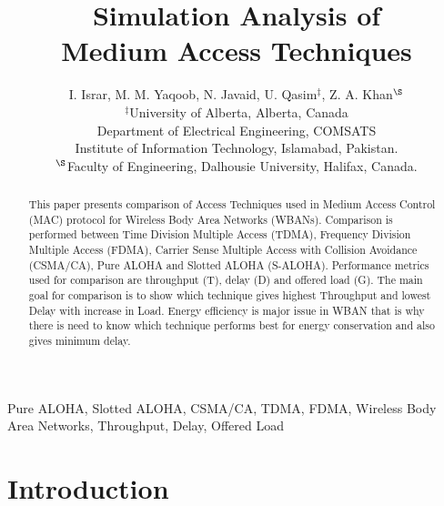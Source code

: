 \documentclass[10pt, conference, compsocconf]{IEEEtran}
\begin{document}
\title{Simulation Analysis of\\ Medium Access Techniques}


\author{I. Israr, M. M. Yaqoob, N. Javaid, U. Qasim$^{\ddag}$, Z. A. Khan$^{\S}$\\

        $^{\ddag}$University of Alberta, Alberta, Canada\\
        Department of Electrical Engineering, COMSATS\\ Institute of
        Information Technology, Islamabad, Pakistan. \\
        $^{\S}$Faculty of Engineering, Dalhousie University, Halifax, Canada.
        }

\maketitle


\begin{abstract}
This paper presents comparison of Access Techniques used in Medium Access Control (MAC) protocol for Wireless Body Area Networks (WBANs). Comparison is performed between Time Division Multiple Access (TDMA), Frequency Division Multiple Access (FDMA), Carrier Sense Multiple Access with Collision Avoidance (CSMA/CA), Pure ALOHA and Slotted ALOHA (S-ALOHA). Performance metrics used for comparison are throughput (T), delay (D) and offered load (G). The main goal for comparison is to show which technique gives highest Throughput and lowest Delay with increase in Load. Energy efficiency is major issue in WBAN that is why there is need to know which technique performs best for energy conservation and also gives minimum delay.
\end{abstract}


\begin{IEEEkeywords}
Pure ALOHA, Slotted ALOHA, CSMA/CA, TDMA, FDMA, Wireless Body Area Networks, Throughput, Delay, Offered Load
\end{IEEEkeywords}

\section{Introduction}
\end{document}
